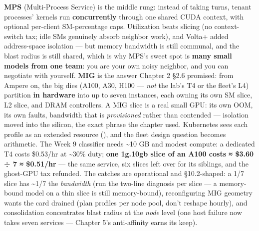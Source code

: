 \textbf{MPS} (Multi-Process Service) is the middle rung: instead of taking turns, tenant processes' kernels run \textbf{concurrently} through one shared CUDA context, with optional per-client SM-percentage caps. Utilization beats slicing (no context-switch tax; idle SMs genuinely absorb neighbor work), and Volta+ added address-space isolation — but memory bandwidth is still communal, and the blast radius is still shared, which is why MPS's sweet spot is \textbf{many small models from one team}: you are your own noisy neighbor, and you can negotiate with yourself. \textbf{MIG} is the answer Chapter 2 §2.6 promised: from Ampere on, the big dies (A100, A30, H100 — \textit{not} the lab's T4 or the fleet's L4) partition \textbf{in hardware} into up to seven instances, each owning its own SM slice, L2 slice, and DRAM controllers. A MIG slice is a real small GPU: its own OOM, its own faults, bandwidth that is \textit{provisioned} rather than contended — isolation moved into the silicon, the exact phrase the chapter used. Kubernetes sees each profile as an extended resource (), and the fleet design question becomes arithmetic. The Week 9 classifier needs \textasciitilde{}10 GB and modest compute: a dedicated T4 costs \$0.53/hr at \textasciitilde{}30\% duty; \textbf{one 1g.10gb slice of an A100 costs ≈ \$3.60 ÷ 7 ≈ \$0.51/hr} — the same service, six slices left over for its siblings, and the ghost-GPU tax refunded. The catches are operational and §10.2-shaped: a 1/7 slice has \textasciitilde{}1/7 the \textit{bandwidth} (run the two-line diagnosis per slice — a memory-bound model on a thin slice is still memory-bound), reconfiguring MIG geometry wants the card drained (plan profiles per node pool, don't reshape hourly), and consolidation concentrates blast radius at the \textit{node} level (one host failure now takes seven services — Chapter 5's anti-affinity earns its keep).

